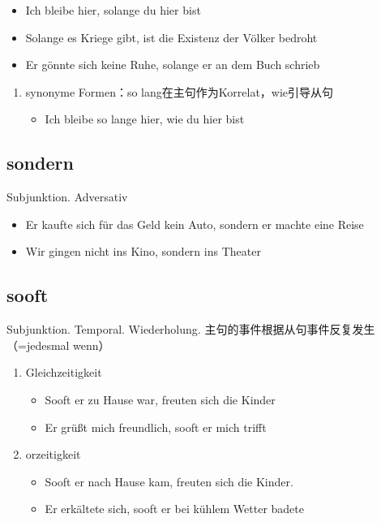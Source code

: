 \documentclass[UTF8]{report}
\begin{document}
\begin{itemize}
    \item Ich bleibe hier, solange du hier bist
    \item Solange es Kriege gibt, ist die Existenz der Völker bedroht
    \item Er gönnte sich keine Ruhe, solange er an dem Buch schrieb
\end{itemize}

\begin{enumerate}
    \item synonyme Formen：so lang在主句作为Korrelat，wie引导从句
    \begin{itemize}
        \item Ich bleibe so lange hier, wie du hier bist
    \end{itemize}
\end{enumerate}

\subsection{sondern}
Subjunktion. Adversativ
\begin{itemize}
    \item Er kaufte sich für das Geld kein Auto, sondern er machte eine Reise
    \item Wir gingen nicht ins Kino, sondern ins Theater
\end{itemize}

\subsection{sooft}
Subjunktion. Temporal. Wiederholung. 主句的事件根据从句事件反复发生（=jedesmal wenn）
\begin{enumerate}
    \item Gleichzeitigkeit
    \begin{itemize}
        \item Sooft er zu Hause war, freuten sich die Kinder
        \item Er grüßt mich freundlich, sooft er mich trifft
    \end{itemize}
    \item orzeitigkeit
    \begin{itemize}
        \item Sooft er nach Hause kam, freuten sich die Kinder.
        \item Er erkältete sich, sooft er bei kühlem Wetter badete
    \end{itemize}
\end{enumerate}
\end{document}
